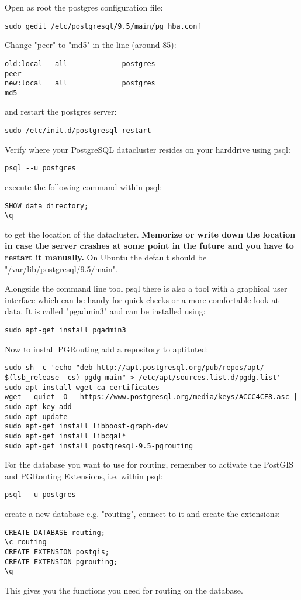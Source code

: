 \documentclass{article}
\begin{document}
Open as root the postgres configuration file:
\begin{verbatim}
sudo gedit /etc/postgresql/9.5/main/pg_hba.conf
\end{verbatim}
Change "peer" to "md5" in the line (around 85):
\begin{verbatim}
old:local   all             postgres                                peer
new:local   all             postgres                                md5
\end{verbatim}
and restart the postgres server:
\begin{verbatim}
sudo /etc/init.d/postgresql restart
\end{verbatim}

Verify where your PostgreSQL datacluster resides on your harddrive
using psql:
\begin{verbatim}
psql --u postgres
\end{verbatim}
execute the following command within psql:
\begin{verbatim}
SHOW data_directory;
\q
\end{verbatim}
to get the location of the datacluster. \textbf{Memorize or write down the location in case the server crashes at some point in the future 
and you have to restart it manually.}
On Ubuntu the default should be "/var/lib/postgresql/9.5/main".

Alongside the command line tool psql there is also a tool
with a graphical user interface which can be handy for
quick checks or a more comfortable look at data.
It is called "pgadmin3" and can be installed using:
\begin{verbatim}
sudo apt-get install pgadmin3
\end{verbatim}


Now to install PGRouting add a repository to aptituted:
\begin{verbatim}
sudo sh -c 'echo "deb http://apt.postgresql.org/pub/repos/apt/ $(lsb_release -cs)-pgdg main" > /etc/apt/sources.list.d/pgdg.list'
sudo apt install wget ca-certificates
wget --quiet -O - https://www.postgresql.org/media/keys/ACCC4CF8.asc | sudo apt-key add -
sudo apt update
sudo apt-get install libboost-graph-dev
sudo apt-get install libcgal*
sudo apt-get install postgresql-9.5-pgrouting
\end{verbatim}

For the database you want to use for routing, remember to activate
the PostGIS and PGRouting Extensions, i.e. within psql:
\begin{verbatim}
psql --u postgres
\end{verbatim}
create a new database e.g. "routing", 
connect to it and create the extensions:
\begin{verbatim}
CREATE DATABASE routing;
\c routing
CREATE EXTENSION postgis;
CREATE EXTENSION pgrouting;
\q
\end{verbatim}
This gives you the functions you need for routing on the database.
\end{document}
